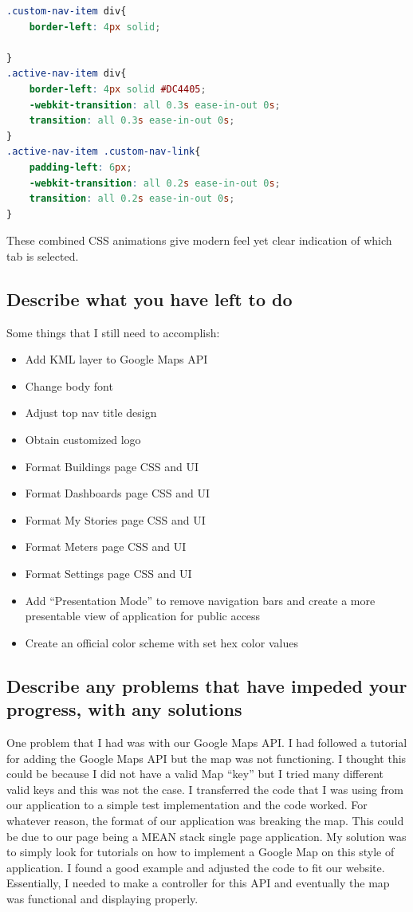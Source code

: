 \documentclass[letterpaper,10pt,serif,draftclsnofoot,onecolumn,compsoc,titlepage]{IEEEtran}
\begin{document}
	\begin{lstlisting}[caption={CSS Implementation} language=CSS]
.custom-nav-item div{
    border-left: 4px solid;
	
}
.active-nav-item div{
    border-left: 4px solid #DC4405;
    -webkit-transition: all 0.3s ease-in-out 0s;
    transition: all 0.3s ease-in-out 0s;
}
.active-nav-item .custom-nav-link{
    padding-left: 6px;
	-webkit-transition: all 0.2s ease-in-out 0s;
    transition: all 0.2s ease-in-out 0s;
}
	\end{lstlisting}
	
	These combined CSS animations give modern feel yet clear indication of which tab is selected.
	
\subsection{Describe what you have left to do}
Some things that I still need to accomplish:
\begin{itemize}
  \item Add KML layer to Google Maps API
  \item Change body font
  \item Adjust top nav title design
  \item Obtain customized logo
  \item Format Buildings page CSS and UI
  \item Format Dashboards page CSS and UI
  \item Format My Stories page CSS and UI
  \item Format Meters page CSS and UI
  \item Format Settings page CSS and UI
  \item Add ``Presentation Mode'' to remove navigation bars and create a more presentable view of application for public access
  \item Create an official color scheme with set hex color values

  
\end{itemize}
\subsection{Describe any problems that have impeded your progress, with any solutions}
One problem that I had was with our Google Maps API. I had followed a tutorial for adding the Google Maps API but the map was not functioning. I thought this could 
be because I did not have a valid Map ``key'' but I tried many different valid keys and this was not the case. I transferred the code that I was using from our application
to a simple test implementation and the code worked. For whatever reason, the format of our application was breaking the map. This could be due to our page being a 
MEAN stack single page application. My solution was to simply look for tutorials on how to implement a Google Map on this style of application. I found a good example and 
adjusted the code to fit our website. Essentially, I needed to make a controller for this API and eventually the map was functional and displaying properly.
\end{document}
